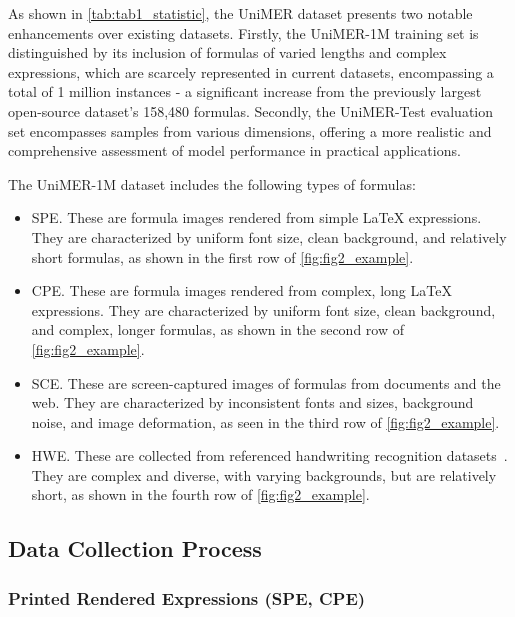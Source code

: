 \documentclass[runningheads]{llncs}
\begin{document}
As shown in \cref{tab:tab1_statistic}, the UniMER dataset presents two notable enhancements over existing datasets. Firstly, the UniMER-1M training set is distinguished by its inclusion of formulas of varied lengths and complex expressions, which are scarcely represented in current datasets, encompassing a total of 1 million instances - a significant increase from the previously largest open-source dataset's 158,480 formulas. Secondly, the UniMER-Test evaluation set encompasses samples from various dimensions, offering a more realistic and comprehensive assessment of model performance in practical applications.


The UniMER-1M dataset includes the following types of formulas:

\begin{itemize}
    \item SPE. These are formula images rendered from simple LaTeX expressions. They are characterized by uniform font size, clean background, and relatively short formulas, as shown in the first row of \cref{fig:fig2_example}.   
    
    \item CPE. These are formula images rendered from complex, long LaTeX expressions. They are characterized by uniform font size, clean background, and complex, longer formulas, as shown in the second row of \cref{fig:fig2_example}.
    
    \item SCE. These are screen-captured images of formulas from documents and the web. They are characterized by inconsistent fonts and sizes, background noise, and image deformation, as seen in the third row of  \cref{fig:fig2_example}.
    
    \item HWE. These are collected from referenced handwriting recognition datasets~\cite{mouchere2014icfhr,mouchere2016icfhr2016,mahdavi2019icdar,yuan2022syntax}. They are complex and diverse, with varying backgrounds, but are relatively short, as shown in the fourth row of  \cref{fig:fig2_example}.

\end{itemize}


\subsection{Data Collection Process}

\subsubsection{Printed Rendered Expressions (SPE, CPE)}
\end{document}
